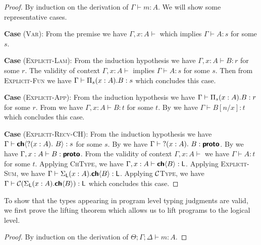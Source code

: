 \begin{proof}
  By induction on the derivation of $\Gamma \vdash m : A$. We will show some representative cases.

\textbf{Case} (\textsc{Var}): 
  From the premise we have $\Gamma, x : A \vdash$ which implies $\Gamma \vdash A : s$ for some $s$.

\textbf{Case} (\textsc{Explicit-Lam}):
  From the induction hypothesis we have $\Gamma, x : A \vdash B : r$ for some $r$.
  The validity of context $\Gamma, x : A \vdash$ implies $\Gamma \vdash A : s$ for some $s$.
  Then from \textsc{Explicit-Fun} we have $\Gamma \vdash \Pi_{s}({x : A}).{B} : s$ which concludes this case.

\textbf{Case} (\textsc{Explicit-App}):
  From the induction hypothesis we have $\Gamma \vdash \Pi_{s}({x : A}).{B} : r$ for some $r$.
  From  we have $\Gamma, x : A \vdash B : t$ for some $t$.
  By  we have $\Gamma \vdash B[n/x] : t$ which concludes this case.

\textbf{Case} (\textsc{Explicit-Recv-CH}):
  From the induction hypothesis we have $\Gamma \vdash {\textbf{\textsf{ch}}\langle{{{?}({x : A}).\ {B}}}\rangle} : s$ for some $s$.
  By  we have $\Gamma \vdash {{?}({x : A}).\ {B}} : \textbf{\textsf{proto}}$.
  By  we have $\Gamma, x : A \vdash B : \textbf{\textsf{proto}}$.
  From the validity of context $\Gamma, x : A \vdash$ we have $\Gamma \vdash A : t$ for some $t$.
  Applying \textsc{ChType}, we have $\Gamma, x : A \vdash {\textbf{\textsf{ch}}\langle{B}\rangle} : \textsf{L}$.
  Applying \textsc{Explicit-Sum}, we have $\Gamma \vdash \Sigma_{\textsf{L}}({x : A}).{{\textbf{\textsf{ch}}\langle{B}\rangle}} : \textsf{L}$.
  Applying \textsc{$\mathcal{C}$Type}, we have $\Gamma \vdash \mathcal{C}({\Sigma_{\textsf{L}}({x : A}).{{\textbf{\textsf{ch}}\langle{B}\rangle}}}) : \textsf{L}$ which concludes this case.
\end{proof}

To show that the types appearing in program level typing judgments are valid, 
we first prove the lifting theorem which allows us to lift programs to the logical level.

\begin{proof}
  By induction on the derivation of $\Theta ; \Gamma ; \Delta \vdash m : A$.
\end{proof}

